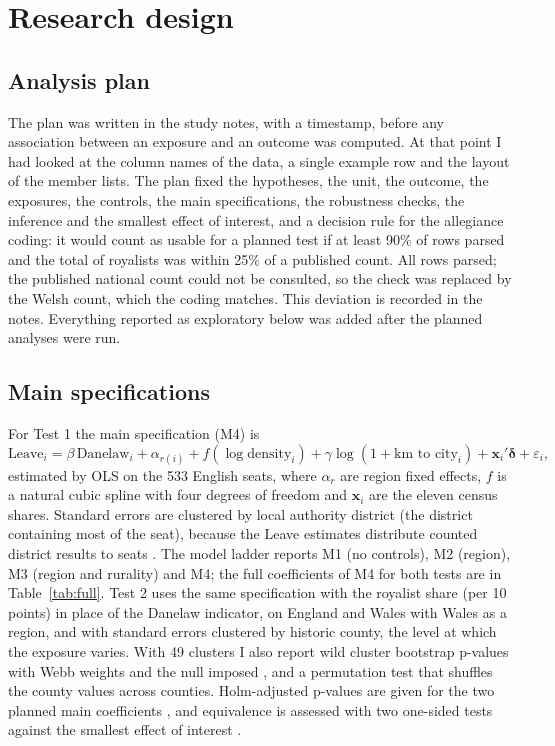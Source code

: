 \documentclass[11pt,a4paper]{article}
\begin{document}
\section{Research design}\label{sec:design}
\subsection{Analysis plan}
The plan was written in the study notes, with a timestamp, before any association between an exposure and an outcome was computed. At that point I had looked at the column names of the data, a single example row and the layout of the member lists. The plan fixed the hypotheses, the unit, the outcome, the exposures, the controls, the main specifications, the robustness checks, the inference and the smallest effect of interest, and a decision rule for the allegiance coding: it would count as usable for a planned test if at least 90\% of rows parsed and the total of royalists was within 25\% of a published count. All rows parsed; the published national count could not be consulted, so the check was replaced by the Welsh count, which the coding matches. This deviation is recorded in the notes. Everything reported as exploratory below was added after the planned analyses were run.

\subsection{Main specifications}
For Test 1 the main specification (M4) is
\begin{equation}
\text{Leave}_i = \beta\,\text{Danelaw}_i + \alpha_{r(i)} + f(\log \text{density}_i) + \gamma \log(1+\text{km to city}_i) + \mathbf{x}_i'\boldsymbol\delta + \varepsilon_i,
\end{equation}
estimated by OLS on the 533 English seats, where $\alpha_r$ are region fixed effects, $f$ is a natural cubic spline with four degrees of freedom and $\mathbf{x}_i$ are the eleven census shares. Standard errors are clustered by local authority district (the district containing most of the seat), because the Leave estimates distribute counted district results to seats \citep{hanretty2017,cameron2015}. The model ladder reports M1 (no controls), M2 (region), M3 (region and rurality) and M4; the full coefficients of M4 for both tests are in Table~\ref{tab:full}. Test 2 uses the same specification with the royalist share (per 10 points) in place of the Danelaw indicator, on England and Wales with Wales as a region, and with standard errors clustered by historic county, the level at which the exposure varies. With 49 clusters I also report wild cluster bootstrap p-values with Webb weights and the null imposed \citep{cameron2008,webb2023}, and a permutation test that shuffles the county values across counties. Holm-adjusted p-values are given for the two planned main coefficients \citep{holm1979}, and equivalence is assessed with two one-sided tests against the smallest effect of interest \citep{lakens2017}.
\end{document}
